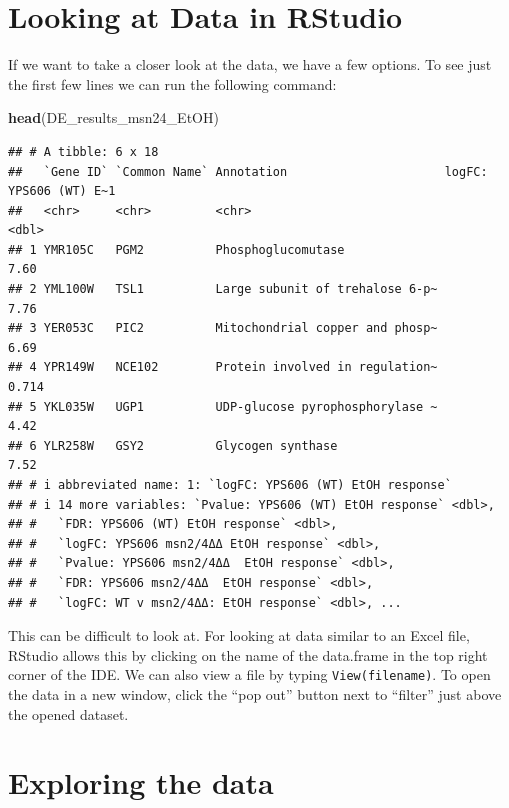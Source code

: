 \documentclass[
]{book}
\newenvironment{Shaded}{\begin{snugshade}}{\end{snugshade}}
\newcommand{\FunctionTok}[1]{\textcolor[rgb]{0.13,0.29,0.53}{\textbf{#1}}}
\newcommand{\NormalTok}[1]{#1}
\begin{document}
\hypertarget{looking-at-data-in-rstudio}{%
\section{Looking at Data in RStudio}\label{looking-at-data-in-rstudio}}

If we want to take a closer look at the data, we have a few options. To see just the first few lines we can run the following command:

\begin{Shaded}
\begin{Highlighting}[]
\FunctionTok{head}\NormalTok{(DE\_results\_msn24\_EtOH)}
\end{Highlighting}
\end{Shaded}

\begin{verbatim}
## # A tibble: 6 x 18
##   `Gene ID` `Common Name` Annotation                      logFC: YPS606 (WT) E~1
##   <chr>     <chr>         <chr>                                            <dbl>
## 1 YMR105C   PGM2          Phosphoglucomutase                               7.60 
## 2 YML100W   TSL1          Large subunit of trehalose 6-p~                  7.76 
## 3 YER053C   PIC2          Mitochondrial copper and phosp~                  6.69 
## 4 YPR149W   NCE102        Protein involved in regulation~                  0.714
## 5 YKL035W   UGP1          UDP-glucose pyrophosphorylase ~                  4.42 
## 6 YLR258W   GSY2          Glycogen synthase                                7.52 
## # i abbreviated name: 1: `logFC: YPS606 (WT) EtOH response`
## # i 14 more variables: `Pvalue: YPS606 (WT) EtOH response` <dbl>,
## #   `FDR: YPS606 (WT) EtOH response` <dbl>,
## #   `logFC: YPS606 msn2/4ΔΔ EtOH response` <dbl>,
## #   `Pvalue: YPS606 msn2/4ΔΔ  EtOH response` <dbl>,
## #   `FDR: YPS606 msn2/4ΔΔ  EtOH response` <dbl>,
## #   `logFC: WT v msn2/4ΔΔ: EtOH response` <dbl>, ...
\end{verbatim}

This can be difficult to look at. For looking at data similar to an Excel file, RStudio allows this by clicking on the name of the data.frame in the top right corner of the IDE. We can also view a file by typing \texttt{View(filename)}. To open the data in a new window, click the ``pop out'' button next to ``filter'' just above the opened dataset.

\hypertarget{exploring-the-data}{%
\section{Exploring the data}\label{exploring-the-data}}
\end{document}
